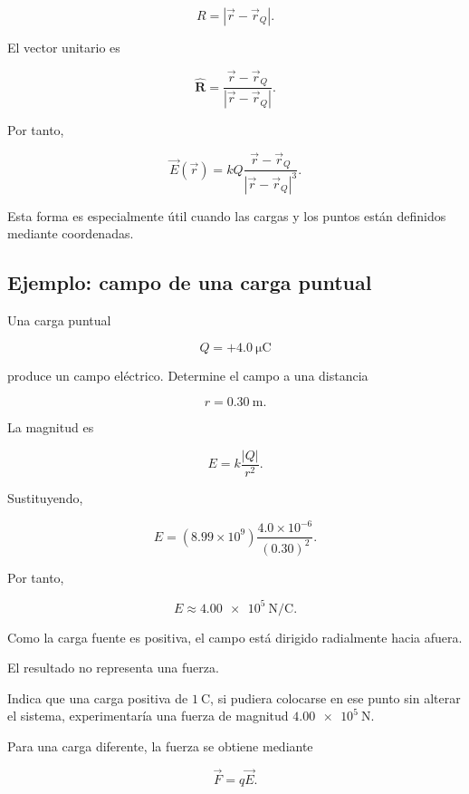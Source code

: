 \[
R=|\vec r-\vec r_Q|.
\]

El vector unitario es

\[
\hat{\mathbf R}=\frac{\vec r-\vec r_Q}{|\vec r-\vec r_Q|}.
\]

Por tanto,

\begin{equation}
\boxed{
\vec E(\vec r)
=
kQ\frac{\vec r-\vec r_Q}{|\vec r-\vec r_Q|^3}
}.
\label{eq:campo_puntual_posiciones}
\end{equation}

Esta forma es especialmente útil cuando las cargas y los puntos están definidos
mediante coordenadas.


\subsection{Ejemplo: campo de una carga puntual}

\begin{ejemplo}

Una carga puntual

\[
Q=+\SI{4.0}{\micro\coulomb}
\]

produce un campo eléctrico. Determine el campo a una distancia

\[
r=\SI{0.30}{\metre}.
\]

\end{ejemplo}

La magnitud es

\[
E=k\frac{|Q|}{r^2}.
\]

Sustituyendo,

\[
E=(8.99\times10^9)\frac{4.0\times10^{-6}}{(0.30)^2}.
\]

Por tanto,

\[
\boxed{E\approx\SI{4.00e5}{\newton\per\coulomb}}.
\]

Como la carga fuente es positiva, el campo está dirigido radialmente hacia afuera.

\begin{interpretacion}

El resultado no representa una fuerza.

Indica que una carga positiva de \(\SI{1}{\coulomb}\), si pudiera colocarse en ese
punto sin alterar el sistema, experimentaría una fuerza de magnitud
\(\SI{4.00e5}{\newton}\).

Para una carga diferente, la fuerza se obtiene mediante

\[
\vec F=q\vec E.
\]

\end{interpretacion}


